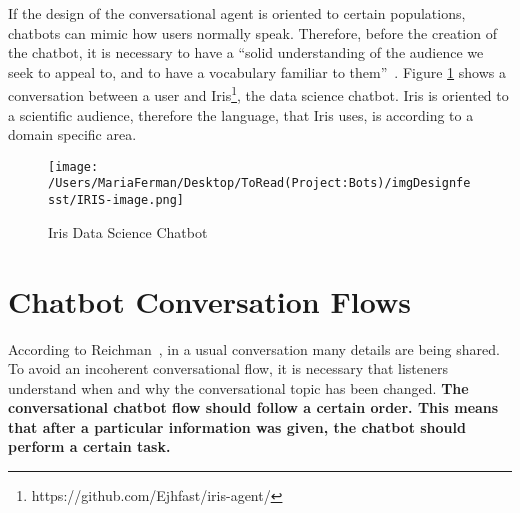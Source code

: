 \documentclass[a4paper,10pt]{article}
\begin{document}
 If the design of the conversational agent is oriented to certain populations, chatbots can mimic how users normally speak.  Therefore, before the creation of the chatbot, it is necessary to have a ``solid understanding of the audience we seek to appeal to, and to have a vocabulary familiar to them”~\cite{HeuristicsWebPage}. Figure \ref{FigureIRIS} shows a conversation between a user and Iris\footnote{https://github.com/Ejhfast/iris-agent/}, the data science chatbot. Iris is oriented to a scientific audience, therefore the language, that Iris uses, is according to a domain specific area.  

\begin{figure}
\centering
\texttt{[image: /Users/MariaFerman/Desktop/ToRead(Project:Bots)/imgDesignfesst/IRIS-image.png]}
\caption{Iris Data Science Chatbot}
\label{FigureIRIS}
\end{figure}
\section{Chatbot Conversation Flows}
According to Reichman~\cite{reichman1985getting}, in a usual conversation many details are being shared. To avoid an incoherent conversational flow, it is necessary that listeners understand when and why the conversational topic has been changed. \textbf{The conversational chatbot flow should follow a certain order. This means that after a particular information was given, the chatbot should perform a certain task.} 
\end{document}
